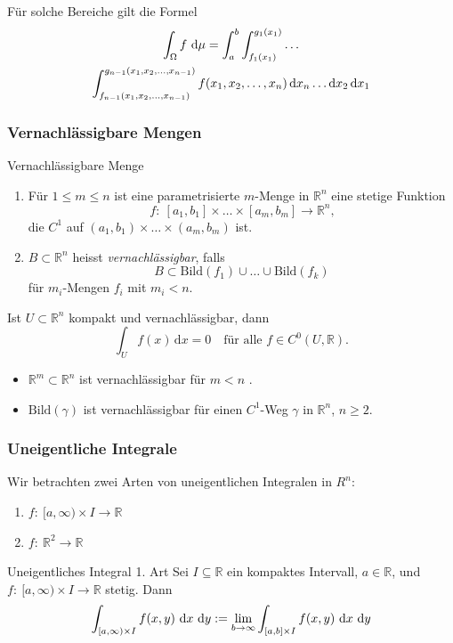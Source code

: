 \documentclass[a4paper,10pt]{article}
\def\R{\mathbb{R}}
\begin{document}
Für solche Bereiche gilt die Formel \begin{multline*}
    \int_\Omega f \, \odif{\mu} = \int_a^b \int_{f_1(x_1)}^{g_1(x_1)} \dots \\ \int_{f_{n - 1}(x_1, x_2, \dots, x_{n - 1})}^{g_{n - 1}(x_1, x_2, \dots, x_{n - 1})} f(x_1, x_2, \dots, x_n) \odif{x_n} \dots \odif{x_2} \odif{x_1}
\end{multline*}


\subsubsection{Vernachlässigbare Mengen}
\begin{subbox}{Vernachlässigbare Menge}
    \begin{enumerate}
        \item Für \( 1 \leq m \leq n \) ist eine parametrisierte \( m \)-Menge in \( \R^n \) eine stetige Funktion \[
            f: \: [a_1, b_1] \times \dots \times [a_m, b_m] \to \R^n \text{,}
        \]
        die \( C^1 \) auf \( (a_1, b_1) \times \dots \times (a_m, b_m) \) ist.
        \item \( B \subset \R^n \) heisst \emph{vernachlässigbar}, falls \[
            B \subset \mathrm{Bild}(f_1) \cup \dots \cup \textrm{Bild}(f_k)
        \] für \( m_i \)-Mengen \( f_i \) mit \( m_i < n \).
    \end{enumerate}
\end{subbox}

\begin{subbox}{}
    Ist \( U \subset \R^n \) kompakt und vernachlässigbar, dann
    \[
        \int_U f(x) \, \mathrm{d}x = 0 \quad \text{für alle } f \in C^0(U, \R) \text{.}
    \]
\end{subbox}

\begin{itemize}
    \item \( \R^m \subset \R^n \) ist vernachlässigbar für \( m < n \) .
    \item \( \mathrm{Bild}(\gamma) \) ist vernachlässigbar für einen \( C^1 \)-Weg \( \gamma \) in \( \R^n \), \( n \geq 2 \).
\end{itemize}


\subsubsection{Uneigentliche Integrale}
Wir betrachten zwei Arten von uneigentlichen Integralen in \( R^n \):
\begin{enumerate}
    \item \( f: \: [a, \infty) \times I \to \R \)
    \item \( f: \: \R^2 \to \R \)
\end{enumerate}
\begin{subbox}{Uneigentliches Integral 1. Art}
    Sei \( I \subseteq \R \) ein kompaktes Intervall, \( a \in \R \), und \( f: \: [a, \infty) \times I \to \R \) stetig. Dann
    \[
        \int_{[a, \infty) \times I} f(x, y) \, \odif{x} \, \odif{y} := \lim_{b \to \infty} \int_{[a, b] \times I} f(x, y) \, \odif{x} \, \odif{y}
    \]
\end{subbox}
\end{document}
